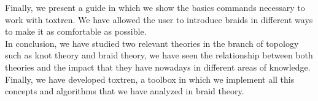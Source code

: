 Finally, we present a guide in which we show the basics commands necessary to work with toxtren. We have allowed the user to introduce braids in different ways to make it as comfortable as possible.\\

\newpage
In conclusion, we have studied two relevant theories in the branch of topology such as knot theory and braid theory, we have seen the relationship between both theories and the impact that they have nowadays in different areas of knowledge. Finally, we have developed toxtren, a toolbox in which we implement all this concepts and algorithms that we have analyzed in braid theory.\\










